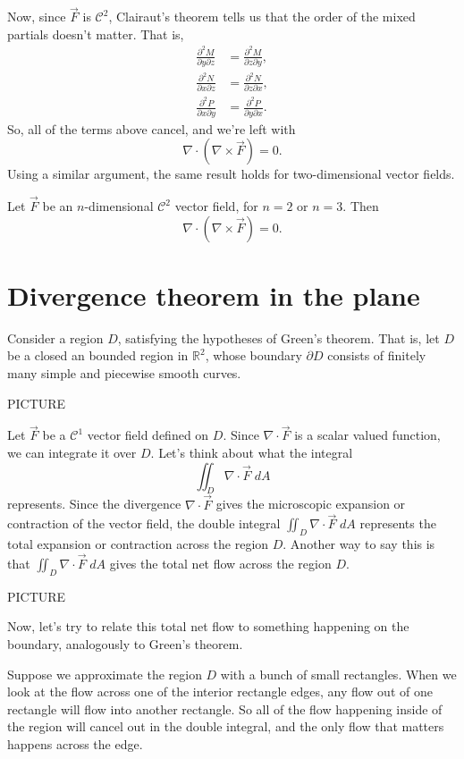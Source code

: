 \documentclass{ximera}
\begin{document}
Now, since $\vec{F}$ is $\mathcal{C}^2$, Clairaut's theorem tells us that the order of the mixed partials doesn't matter. That is,
\begin{align*}
\frac{\partial^2 M}{\partial y \partial z} &= \frac{\partial^2 M}{\partial z \partial y},\\
\frac{\partial^2 N}{\partial x \partial z} &= \frac{\partial^2 N}{\partial z \partial x},\\
\frac{\partial^2 P}{\partial x \partial y} &= \frac{\partial^2 P}{\partial y \partial x}.
\end{align*}
So, all of the terms above cancel, and we're left with
\[
\nabla \cdot (\nabla \times \vec{F}) = 0.
\]
Using a similar argument, the same result holds for two-dimensional vector fields.

\begin{proposition}
Let $\vec{F}$ be an $n$-dimensional $\mathcal{C}^2$ vector field, for $n=2$ or $n=3$. Then
\[
\nabla \cdot (\nabla \times \vec{F}) = 0.
\]
\end{proposition}

\section*{Divergence theorem in the plane}

Consider a region $D$, satisfying the hypotheses of Green's theorem. That is, let $D$ be a closed an bounded region in $\mathbb{R}^2$, whose boundary $\partial D$ consists of finitely many simple and piecewise smooth curves.

PICTURE

Let $\vec{F}$ be a $\mathcal{C}^1$ vector field defined on $D$. Since $\nabla\cdot \vec{F}$ is a scalar valued function, we can integrate it over $D$. Let's think about what the integral
\[
\iint_D \nabla\cdot \vec{F}\;dA
\]
represents. Since the divergence $\nabla\cdot \vec{F}$ gives the microscopic expansion or contraction of the vector field, the double integral $\iint_D \nabla\cdot \vec{F}\;dA$ represents the total expansion or contraction across the region $D$. Another way to say this is that $\iint_D \nabla\cdot \vec{F}\;dA$ gives the total net flow across the region $D$. 

PICTURE

Now, let's try to relate this total net flow to something happening on the boundary, analogously to Green's theorem.

Suppose we approximate the region $D$ with a bunch of small rectangles. When we look at the flow across one of the interior rectangle edges, any flow out of one rectangle will flow into another rectangle. So all of the flow happening inside of the region will cancel out in the double integral, and the only flow that matters happens across the edge.
\end{document}
